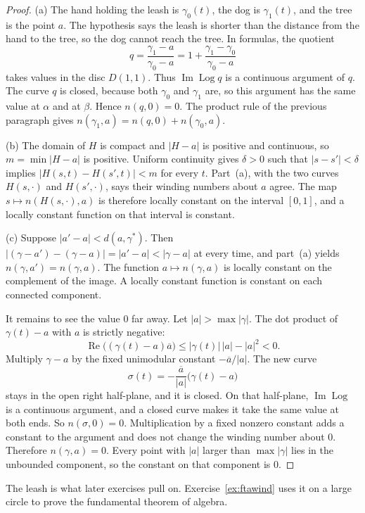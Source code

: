 \begin{proof}
(a) The hand holding the leash is $\gamma_0(t)$, the dog is $\gamma_1(t)$, and the tree is the point $a$. The hypothesis says the leash is shorter than the distance from the hand to the tree, so the dog cannot reach the tree. In formulas, the quotient
\[
q=\frac{\gamma_1-a}{\gamma_0-a}=1+\frac{\gamma_1-\gamma_0}{\gamma_0-a}
\]
takes values in the disc $D(1,1)$. Thus $\operatorname{Im}\operatorname{Log} q$ is a continuous argument of $q$. The curve $q$ is closed, because both $\gamma_0$ and $\gamma_1$ are, so this argument has the same value at $\alpha$ and at $\beta$. Hence $n(q,0)=0$. The product rule of the previous paragraph gives $n(\gamma_1,a)=n(q,0)+n(\gamma_0,a)$.

(b) The domain of $H$ is compact and $|H-a|$ is positive and continuous, so $m=\min|H-a|$ is positive. Uniform continuity gives $\delta>0$ such that $|s-s'|<\delta$ implies $|H(s,t)-H(s',t)|<m$ for every $t$. Part~(a), with the two curves $H(s,\cdot)$ and $H(s',\cdot)$, says their winding numbers about $a$ agree. The map $s\mapsto n(H(s,\cdot),a)$ is therefore locally constant on the interval $[0,1]$, and a locally constant function on that interval is constant.

(c) Suppose $|a'-a|<d(a,\gamma^*)$. Then $|(\gamma-a')-(\gamma-a)|=|a'-a|<|\gamma-a|$ at every time, and part~(a) yields $n(\gamma,a')=n(\gamma,a)$. The function $a\mapsto n(\gamma,a)$ is locally constant on the complement of the image. A locally constant function is constant on each connected component.

It remains to see the value $0$ far away. Let $|a|>\max|\gamma|$. The dot product of $\gamma(t)-a$ with $a$ is strictly negative:
\[
\operatorname{Re}\bigl((\gamma(t)-a)\overline a\bigr)\le|\gamma(t)|\,|a|-|a|^2<0.
\]
Multiply $\gamma-a$ by the fixed unimodular constant $-\overline a/|a|$. The new curve
\[
\sigma(t)=-\frac{\overline a}{|a|}\bigl(\gamma(t)-a\bigr)
\]
stays in the open right half-plane, and it is closed. On that half-plane, $\operatorname{Im}\operatorname{Log}$ is a continuous argument, and a closed curve makes it take the same value at both ends. So $n(\sigma,0)=0$. Multiplication by a fixed nonzero constant adds a constant to the argument and does not change the winding number about $0$. Therefore $n(\gamma,a)=0$. Every point with $|a|$ larger than $\max|\gamma|$ lies in the unbounded component, so the constant on that component is $0$.
\end{proof}

The leash is what later exercises pull on. Exercise~\ref{ex:ftawind} uses it on a large circle to prove the fundamental theorem of algebra.

